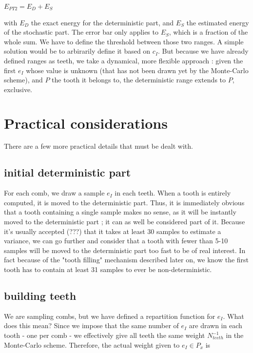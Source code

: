 \documentclass[./thesis.tex]{subfiles}
\begin{document}
$E_{PT2} = E_D + E_S$

with $E_D$ the exact energy for the deterministic part, and $E_S$ the estimated energy of the stochastic part. The error bar only applies to $E_S$, which is a fraction of the whole sum.
We have to define the threshold between those two ranges. A simple solution would be to arbirarily define it based on $c_I$.
But because we have already defined ranges as teeth, we take a dynamical, more flexible approach : given the first $e_I$ whose value is unknown (that has not been drawn yet by the Monte-Carlo scheme), and $P$ the tooth it belongs to, the deterministic range extends to $P$, exclusive.

\section{Practical considerations}

There are a few more practical details that must be dealt with.

\subsection*{initial deterministic part}

For each comb, we draw a sample $e_I$ in each teeth. When a tooth is entirely computed, it is moved to the deterministic part. Thus, it is immediately obvious that a tooth containing a single sample makes no sense, as it will be instantly moved to the deterministic part ; it can as well be considered part of it. Because it's usually accepted (???) that it takes at least 30 samples to estimate a variance, we can go further and consider that a tooth with fewer than 5-10 samples will be moved to the deterministic part too fast to be of real interest. In fact because of the "tooth filling" mechanism described later on, we know the first tooth has to contain at least 31 samples to ever be non-deterministic.






\subsection*{building teeth}

We are sampling combs, but we have defined a repartition function for $e_I$. What does this mean? Since we impose that the same number of $e_I$ are drawn in each tooth - one per comb - we effectively give all teeth the same weight $N_{teeth}^{-1}$ in the Monte-Carlo scheme. Therefore, the actual weight given to $e_I \in P_x$ is
\end{document}
